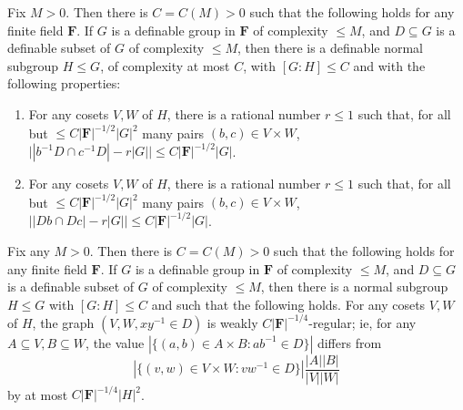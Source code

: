 \documentclass[10pt,a4paper]{amsart}
\begin{document}
\begin{corollary}\label{HF_finitary}
    Fix $M>0$. Then there is $C=C(M)>0$ such that the following holds for any finite field $\mathbf{F}$. If $G$ is a definable group in $\mathbf{F}$ of complexity $\leqslant M$, and $D\subseteq G$ is a definable subset of $G$ of complexity $\leqslant M$, then there is a definable normal subgroup $H\leqslant G$, of complexity at most $C$, with $[G:H]\leqslant C$ and with the following properties:
    \begin{enumerate}
        \item For any cosets $V,W$ of $H$, there is a rational number $r\leqslant 1$ such that, for all but $\leqslant C|\mathbf{F}|^{-1/2}|G|^2$ many pairs $(b,c)\in V\times W$, $\big||b^{-1}D\cap c^{-1}D|-r|G|\big|\leqslant C|\mathbf{F}|^{-1/2}|G|$.
        \item For any cosets $V,W$ of $H$, there is a rational number $r\leqslant 1$ such that, for all but $\leqslant C|\mathbf{F}|^{-1/2}|G|^2$ many pairs $(b,c)\in V\times W$, $\big||Db\cap Dc|-r|G|\big|\leqslant C|\mathbf{F}|^{-1/2}|G|$.
    \end{enumerate}
 \end{corollary}

\begin{lemma}\label{algebraic_regularity_lemma}
    Fix any $M>0$. Then there is $C=C(M)>0$ such that the following holds for any finite field $\mathbf{F}$. If $G$ is a definable group in $\mathbf{F}$ of complexity $\leqslant M$, and $D\subseteq G$ is a definable subset of $G$ of complexity $\leqslant M$, then there is a normal subgroup $H\leqslant G$ with $[G:H]\leqslant C$ and such that the following holds. For any cosets $V,W$ of $H$, the graph $(V,W,xy^{-1}\in D)$ is weakly $C|\mathbf{F}|^{-1/4}$-regular; ie, for any $A\subseteq V,B\subseteq W$, the value $|\{(a,b)\in A\times B:ab^{-1}\in D\}|$ differs from $$|\{(v,w)\in V\times W:vw^{-1}\in D\}|\frac{|A||B|}{|V||W|}$$ by at most $C|\mathbf{F}|^{-1/4}|H|^2$.
\end{lemma}
\end{document}
